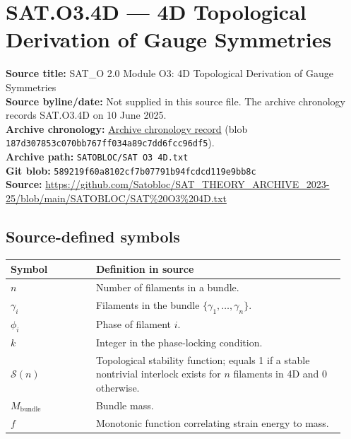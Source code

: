 \documentclass[11pt]{article}
\begin{document}
\section*{SAT.O3.4D --- 4D Topological Derivation of Gauge Symmetries}

\textbf{Source title:} SAT\_O 2.0 Module O3: 4D Topological Derivation of Gauge Symmetries\\
\textbf{Source byline/date:} Not supplied in this source file. The archive chronology records SAT.O3.4D on 10 June 2025.\\
\textbf{Archive chronology:} \href{https://github.com/Satobloc/SAT_THEORY_ARCHIVE_2023-25/blob/main/SAT_HISTORY_ROUNDUP.txt}{Archive chronology record} (blob \texttt{187d307853c070bb767ff034a89c7dd6fcc96df5}).\\
\textbf{Archive path:} \texttt{SATOBLOC/SAT O3 4D.txt}\\
\textbf{Git blob:} \texttt{589219f60a8102cf7b07791b94fcdcd119e9bb8c}\\
\textbf{Source:} \url{https://github.com/Satobloc/SAT_THEORY_ARCHIVE_2023-25/blob/main/SATOBLOC/SAT%20O3%204D.txt}

\subsection*{Source-defined symbols}
\small
\begin{longtable}{L{0.24\linewidth}L{0.70\linewidth}}
\toprule
\textbf{Symbol} & \textbf{Definition in source}\\
\midrule
\endhead
$n$ & Number of filaments in a bundle.\\
$\gamma_i$ & Filaments in the bundle $\{\gamma_1,\ldots,\gamma_n\}$.\\
$\phi_i$ & Phase of filament $i$.\\
$k$ & Integer in the phase-locking condition.\\
$\mathcal{S}(n)$ & Topological stability function; equals 1 if a stable nontrivial interlock exists for $n$ filaments in 4D and 0 otherwise.\\
$M_{\mathrm{bundle}}$ & Bundle mass.\\
$f$ & Monotonic function correlating strain energy to mass.\\
\bottomrule
\end{longtable}
\normalsize
\end{document}
